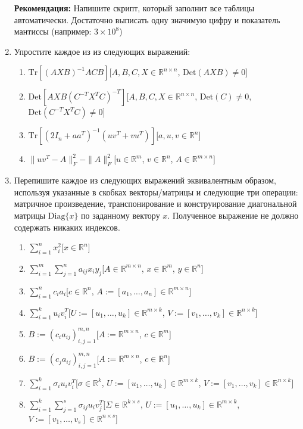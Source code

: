 \documentclass{article}
\newcommand{\R}{\mathbb{R}}
\newcommand{\Tr}{\mathrm{Tr}}
\newcommand{\Det}{\mathrm{Det}}
\newcommand{\Diag}{\mathrm{Diag}}
\begin{document}
\begin{enumerate}[label=\textbf{\arabic*}, leftmargin=0em]
\begin{multicols}{3}
\end{multicols}

\textbf{Рекомендация:} Напишите скрипт, который заполнит все таблицы автоматически. Достаточно выписать одну значимую цифру и показатель мантиссы (например: $3 \times 10^8$)

\item Упростите каждое из из следующих выражений:
\begin{enumerate}
\item $\Tr[(A X B)^{-1} A C B]$\hfill[$A, B, C, X \in \R^{n \times n}$, $\Det(A X B) \neq 0$]
\item $\Det[A X B (C^{-T} X^T C)^{-T}]$\hfill[$A, B, C, X \in \R^{n \times n}$, $\Det(C) \neq 0$, $\Det(C^{-T} X^T C) \neq 0$]
\item $\Tr[(2 I_n + a a^T)^{-1} (u v^T + v u^T)]$\hfill[$a, u, v \in \R^n$]
\item $\| u v^T - A \|_F^2 - \| A \|_F^2$\hfill[$u \in \R^m$, $v \in \R^n$, $A \in \R^{m \times n}$]
\end{enumerate}

\item Перепишите каждое из следующих выражений эквивалентным образом, используя указанные в скобках векторы/матрицы и следующие три операции: матричное произведение, транспонирование и конструирование диагональной матрицы $\Diag\{x\}$ по заданному вектору $x$. Полученное выражение не должно содержать никаких индексов.
\begin{enumerate}
\item $\sum_{i=1}^n x_i^2$\hfill[$x \in \R^n$]
\item $\sum_{i=1}^m \sum_{j=1}^n a_{ij} x_i y_j$\hfill[$A \in \R^{m \times n}$, $x \in \R^m$, $y \in \R^n$]
\item $\sum_{i=1}^n c_i a_i$\hfill[$c \in \R^n$, $A := [a_1, \dots, a_n] \in \R^{m \times n}$]
\item $\sum_{i=1}^k  u_i v_i^T$\hfill[$U := [u_1, \dots, u_k] \in \R^{m \times k}$, $V := [v_1, \dots, v_k] \in \R^{n \times k}$]
\item $B := (c_i a_{ij})_{i,j=1}^{m,n}$\hfill[$A := \R^{m \times n}$, $c \in \R^m$]
\item $B := (c_j a_{ij})_{i,j=1}^{m,n}$\hfill[$A := \R^{m \times n}$, $c \in \R^n$]
\item $\sum_{i=1}^k \sigma_i u_i v_i^T$\hfill[$\sigma \in \R^k$, $U := [u_1, \dots, u_k] \in \R^{m \times k}$, $V := [v_1, \dots, v_k] \in \R^{n \times k}$]
\item $\sum_{i=1}^k \sum_{j=1}^s \sigma_{ij} u_i v_j^T$\hfill[$\Sigma \in \R^{k \times s}$, $U := [u_1, \dots, u_k] \in \R^{m \times k}$, $V := [v_1, \dots, v_s] \in \R^{n \times s}$]
\end{enumerate}


\end{enumerate}
\end{document}
